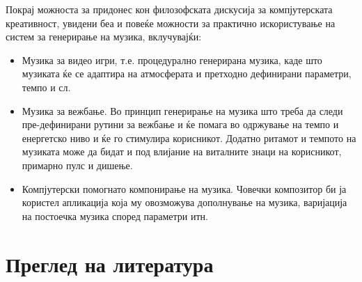 Покрај можноста за придонес кон филозофската дискусија за компјутерската креативност, увидени беа и повеќе можности за практично искористување на систем за генерирање на музика, вклучувајќи:
\begin{itemize}
\item Музика за видео игри, т.е. процедурално генерирана музика, каде што музиката ќе се адаптира на атмосферата и претходно дефинирани параметри, темпо и сл.
\item Музика за вежбање. Во принцип генерирање на музика што треба да следи пре-дефинирани рутини за вежбање и ќе помага во одржување на темпо и енергетско ниво и ќе го стимулира корисникот. Додатно ритамот и темпото на музиката може да бидат и под влијание на виталните знаци на корисникот, примарно пулс и дишење.
\item Компјутерски помогнато компонирање на музика. Човечки композитор би ја користел апликација која му овозможува дополнување на музика, варијација на постоечка музика според параметри итн.
\end{itemize}

\chapter{Преглед на литература}
\label{ch:pregled}

